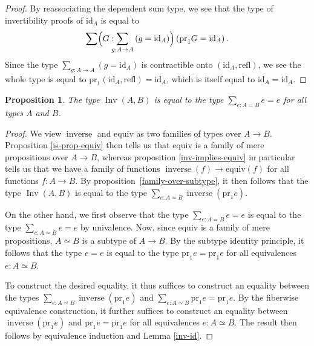 \documentclass{article}
\theoremstyle{plain}
\newtheorem{proposition}[theorem]{Proposition}
\theoremstyle{definition}
\theoremstyle{remark}
\newcommand{\id}{\mathrm{id}}
\newcommand{\isequiv}{\mathrm{equiv}}
\newcommand{\pr}{\mathrm{pr}}
\newcommand{\refl}{\mathrm{refl}}
\DeclareMathOperator{\inv}{Inv}
\DeclareMathOperator{\inverse}{inverse}
\begin{document}
\begin{proof}
  By reassociating the dependent sum type, we see that the type of invertibility proofs of
  \(\id_{A}\) is equal to
  \[\sum \Bigl(G : \hspace{-6pt} \sum_{g : A \to A} \left(g = \id_{A}\right)\Bigr)
    \left( \pr_{1}G = \id_{A}\right).\]
  Since the type \(\sum_{g : A \to A}\left(g = \id_{A}\right)\) is contractible onto
  \(\left(\id_{A}, \refl\right)\), we see the whole type is equal to
  \(\pr_{1}\left(\id_{A}, \refl\right) = \id_{A}\), which is itself equal to
  \(\id_{A} = \id_{A}\).
\end{proof}

\pagebreak

\begin{proposition}
  \label{inv-is-looped-equiv}
  The type \(\inv(A, B)\) is equal to the type \(\sum_{e : A = B} e = e\)
  for all types \(A\) and \(B\).
\end{proposition}

\begin{proof}
  We view \(\inverse\) and \(\isequiv\) as two families of types over \(A \to B\).
  Proposition \ref{is-prop-equiv} then tells us that \(\isequiv\) is a family
  of mere propositions over \(A \to B\), whereas proposition \ref{inv-implies-equiv} in
  particular tells us that we have a family of functions \(\inverse(f) \to \isequiv(f)\) for
  all functions \(f : A \to B\). By proposition~\ref{family-over-subtype}, it then follows
  that the type \(\inv(A, B)\) is equal to the type
  \(\sum_{e : A \simeq B} \inverse(\pr_{1}e)\).

  On the other hand, we first observe that the type \(\sum_{e : A = B} e = e\) is equal to the
  type \(\sum_{e : A \simeq B} e = e\) by univalence. Now, since \(\isequiv\)
  is a family of mere propositions, \(A \simeq B\) is
  a subtype of \(A \to B\). By the subtype identity principle, it follows that the type
  \(e = e\) is equal to the type \(\pr_{1}e = \pr_{1}e\) for all equivalences
  \(e : A \simeq B\).

  To construct the desired equality, it thus suffices to construct an equality between the
  types \(\sum_{e : A \simeq B} \inverse(\pr_{1}e)\) and
  \(\sum_{e : A \simeq B} \pr_{1}e = \pr_{1}e\). By the fiberwise
  equivalence construction, it further suffices to construct an equality between
  \(\inverse(\pr_{1}e)\) and \(\pr_{1}e = \pr_{1}e\) for all equivalences \(e : A \simeq B\).
  The result then follows by equivalence induction and Lemma \ref{inv-id}.
\end{proof}
\end{document}

